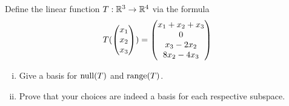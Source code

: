 \begin{question}
    \normalfont
    Define the linear function $T:\mathbb R^3\rightarrow\mathbb R^4$ via the formula 
    \[
        \begin{aligned}
            T(\begin{pmatrix} x_1\\ x_2\\ x_3\end{pmatrix})=\begin{pmatrix} x_1+x_2+x_3\\ 0\\x_3-2x_2 \\ 8x_2-4x_3\end{pmatrix}
        \end{aligned}
    \]
    \begin{enumerate}[(i)]
        \item Give a basis for $\textnormal{null}(T)$ and $\textnormal{range}(T)$.
        \item Prove that your choices are indeed a basis for each respective subspace.
    \end{enumerate}
    
\end{question}


